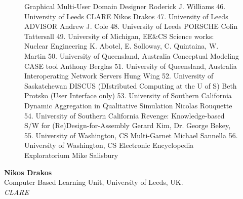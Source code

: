 \begin{figure}
\begin{figcol}
      Graphical Multi-User Domain Designer
      Roderick J. Williams
46. University of Leeds
      CLARE
      Nikos Drakos
47. University of Leeds
      ADVISOR
      Andrew J. Cole
48. University of Leeds
      PORSCHE
      Colin Tattersall
49. University of Michigan, EE\&CS
      Science works: Nuclear Engineering
      K. Abotel, E. Solloway, C. Quintaina, W. Martin
50. University of Queensland, Australia
      Conceptual Modeling CASE tool
      Anthony Berglas
51. University of Queensland, Australia
      Interoperating Network Servers
      Hung Wing
52. University of Saskatchewan
      DISCUS (DIstributed Computing at the U of S)
      Beth Protsko (User Interface only)
53. University of Southern California
      Dynamic Aggregation in Qualitative Simulation
      Nicolas Rouquette
54. University of Southern California
      Revenge: Knowledge-based S/W for
           (Re)Design-for-Assembly
      Gerard Kim,  Dr. George Bekey,
55. University of Washington, CS
      Multi-Garnet
      Michael Sannella
56. University of Washington, CS
      Electronic Encyclopedia Exploratorium
      Mike Salisbury
\end{figcol}
\end{figure}

\newpage{}
\begin{center}
\end{center}
\begin{center}
\end{center}
\begin{tabular}
{\bf Nikos Drakos}\\
Computer Based Learning Unit, University of Leeds, UK.\\
{\it CLARE}\\
\\
\end{tabular}

